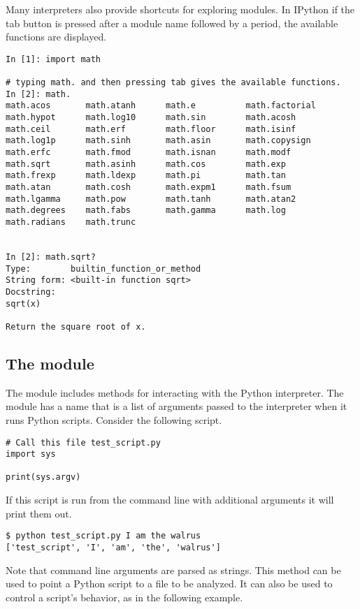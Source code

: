 Many interpreters also provide shortcuts for exploring modules.
In IPython if the tab button is pressed after a module name followed by a period, the available functions are displayed.

\begin{lstlisting}
In [1]: import math

# typing math. and then pressing tab gives the available functions.
In [2]: math.
math.acos       math.atanh      math.e          math.factorial  
math.hypot      math.log10      math.sin        math.acosh      
math.ceil       math.erf        math.floor      math.isinf      
math.log1p      math.sinh       math.asin       math.copysign   
math.erfc       math.fmod       math.isnan      math.modf       
math.sqrt       math.asinh      math.cos        math.exp        
math.frexp      math.ldexp      math.pi         math.tan        
math.atan       math.cosh       math.expm1      math.fsum       
math.lgamma     math.pow        math.tanh       math.atan2      
math.degrees    math.fabs       math.gamma      math.log        
math.radians    math.trunc


In [2]: math.sqrt?
Type:        builtin_function_or_method
String form: <built-in function sqrt>
Docstring:
sqrt(x)

Return the square root of x.
\end{lstlisting}

\subsection*{The  module}

The  module includes methods for interacting with the Python interpreter.
The module has a name  that is a list of arguments passed to the interpreter when it runs Python scripts.
Consider the following script.

\begin{lstlisting}
# Call this file test_script.py
import sys

print(sys.argv)
\end{lstlisting}

If this script is run from the command line with additional arguments it will print them out.

\begin{lstlisting}
$ python test_script.py I am the walrus
['test_script', 'I', 'am', 'the', 'walrus']
\end{lstlisting}

Note that command line arguments are parsed as strings.
This method can be used to point a Python script to a file to be analyzed.
It can also be used to control a script's behavior, as in the following example.

